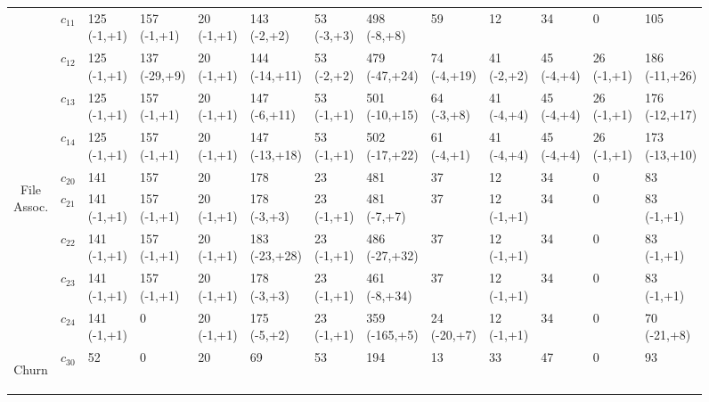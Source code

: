 \begin{figure}
\begin{adjustbox}{max width=\textwidth}
\begin{tabular}{|c|c|l|l|l|l|l|l|l|l|l|l|l|}
\cline{2-13} & $c_{11}$ & 125 (-1,+1) & 157 (-1,+1) & 20 (-1,+1) & 143 (-2,+2) &
53 (-3,+3) & 498 (-8,+8) & 59 & 12 & 34 & 0 & 105
\\

\cline{2-13} & $c_{12}$ & 125 (-1,+1) & 137 (-29,+9) & 20 (-1,+1) & 144
(-14,+11) & 53 (-2,+2) & 479 (-47,+24) & 74 (-4,+19) & 41 (-2,+2) & 45 (-4,+4) &
26 (-1,+1) & 186 (-11,+26)
\\

\cline{2-13} & $c_{13}$ & 125 (-1,+1) & 157 (-1,+1) & 20 (-1,+1) & 147 (-6,+11)
& 53 (-1,+1) & 501 (-10,+15) & 64 (-3,+8) & 41 (-4,+4) & 45 (-4,+4) & 26 (-1,+1)
& 176 (-12,+17)
\\

\cline{2-13} & $c_{14}$ & 125 (-1,+1) & 157 (-1,+1) & 20 (-1,+1) & 147 (-13,+18)
& 53 (-1,+1) & 502 (-17,+22) & 61 (-4,+1) & 41 (-4,+4) & 45 (-4,+4) & 26 (-1,+1)
& 173 (-13,+10)
\\

\hline

\multirow{5}{*}{\begin{sideways}File Assoc.\end{sideways}} 
& $c_{20}$ & 141 & 157 & 20 & 178 & 23 & 481 & 37 & 12 & 34 & 0 & 83 \\
 
\cline{2-13} & $c_{21}$ & 141 (-1,+1) & 157 (-1,+1) & 20 (-1,+1) & 178 (-3,+3) &
23 (-1,+1) & 481 (-7,+7) & 37 & 12 (-1,+1) & 34 & 0 & 83 (-1,+1)
\\

\cline{2-13} & $c_{22}$ & 141 (-1,+1) & 157 (-1,+1) & 20 (-1,+1) & 183 (-23,+28)
& 23 (-1,+1) & 486 (-27,+32) & 37 & 12 (-1,+1) & 34 & 0 & 83 (-1,+1)
\\

\cline{2-13} & $c_{23}$ & 141 (-1,+1) & 157 (-1,+1) & 20 (-1,+1) & 178 (-3,+3) &
23 (-1,+1) & 461 (-8,+34) & 37 & 12 (-1,+1) & 34 & 0 & 83 (-1,+1)
\\

\cline{2-13} & $c_{24}$ & 141 (-1,+1) & 0 & 20 (-1,+1) & 175 (-5,+2) & 23
(-1,+1) & 359 (-165,+5) & 24 (-20,+7) & 12 (-1,+1) & 34 & 0 & 70 (-21,+8)
\\

\hline

\multirow{2}{*}{\begin{sideways}Churn\end{sideways}} 
& $c_{30}$ & 52 & 0 & 20 & 69 & 53 & 194 & 13 & 33 & 47 & 0 & 93 \\ 


\end{tabular}
\end{adjustbox}
\end{figure}
